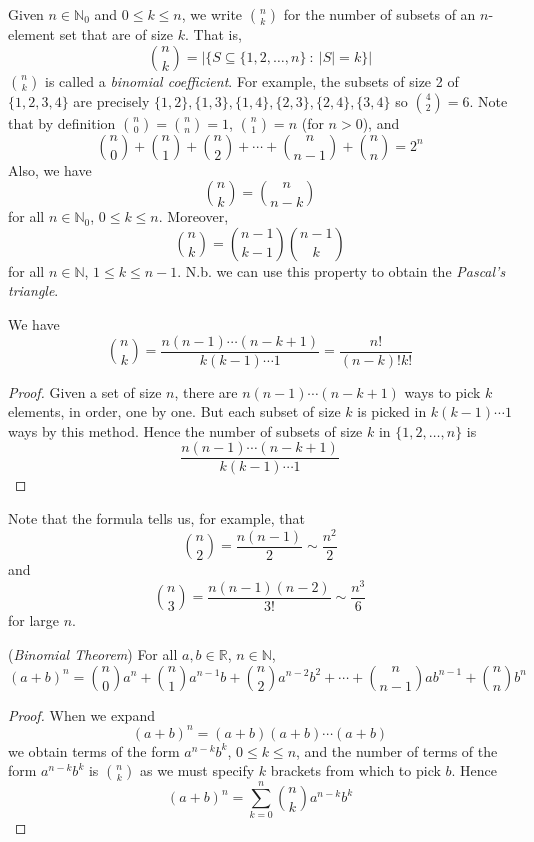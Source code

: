 \documentclass[10pt, a4paper, twoside]{report}
\begin{document}
Given \(n\in\mathbb{N}_0\) and \(0\leq k\leq n\), we write \(\binom nk\) for the number of subsets of an \(n\)-element set that are of size \(k\). That is,
\[\binom nk=|\{S\subseteq\{1,2,\ldots,n\}\::\:|S|=k\}|\]
\(\binom nk\) is called a \emph{binomial coefficient}. For example, the subsets of size 2 of \(\{1,2,3,4\}\) are precisely \(\{1,2\},\{1,3\},\{1,4\},\{2,3\},\{2,4\},\{3,4\}\) so \(\binom 42=6\). Note that by definition \(\binom n0=\binom nn=1\), \(\binom n1=n\) (for \(n>0\)), and 
\[\binom n0+\binom n1+\binom n2+\cdots+\binom n{n-1}+\binom nn=2^n\]
Also, we have 
\[\binom nk=\binom n{n-k}\]
for all \(n\in\mathbb{N}_0\), \(0\leq k\leq n\).
Moreover,
\[\binom nk=\binom{n-1}{k-1}\binom {n-1}k\]
for all \(n\in\mathbb{N}\), \(1\leq k\leq n-1\). N.b. we can use this property to obtain the \emph{Pascal's triangle}.
\begin{proposition}
    We have 
    \[\binom nk=\frac{n(n-1)\cdots(n-k+1)}{k(k-1)\cdots 1}=\frac{n!}{(n-k)!k!}\]
\end{proposition}
\begin{proof}
    Given a set of size \(n\), there are \(n(n-1)\cdots(n-k+1)\) ways to pick \(k\) elements, in order, one by one. But each subset of size \(k\) is picked in \(k(k-1)\cdots 1\) ways by this method. Hence the number of subsets of size \(k\) in \(\{1,2,\ldots,n\}\) is 
    \[\frac{n(n-1)\cdots(n-k+1)}{k(k-1)\cdots 1}\]
\end{proof}
Note that the formula tells us, for example, that 
\[\binom n2=\frac{n(n-1)}{2}\sim\frac{n^2}2\]
and 
\[\binom n3=\frac{n(n-1)(n-2)}{3!}\sim\frac{n^3}{6}\]
for large \(n\).
\begin{theorem} (\emph{Binomial Theorem})
    For all \(a,b\in\mathbb{R}\), \(n\in\mathbb{N}\),
    \[(a+b)^n=\binom n0a^n+\binom n1a^{n-1}b+\binom n2a^{n-2}b^2+\cdots+\binom n{n-1}ab^{n-1}+\binom nnb^n\]
\end{theorem}
\begin{proof}
    When we expand 
    \[(a+b)^n=(a+b)(a+b)\cdots(a+b)\]
    we obtain terms of the form \(a^{n-k}b^k\), \(0\leq k\leq n\), and the number of terms of the form \(a^{n-k}b^k\) is \(\binom nk\) as we must specify \(k\) brackets from which to pick \(b\). Hence
    \[(a+b)^n=\sum_{k=0}^{n}\binom nka^{n-k}b^k\]
\end{proof}
\end{document}
